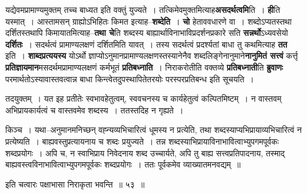\documentclass[article,12pt,a4paper]{memoir}
\begin{document}
	  \pstart यद्येवमप्रामाण्यमुक्तम् तच्च बाध्य\leavevmode{}त इति वक्तुं युज्यते । तत्किमेवमुक्तमित्याह\textbf{असदर्थत्वमि}ति । \textbf{ही}ति यस्मात् । आस्तामसन् ग्राह्योऽभिहितः किमत इत्याह--\textbf{शब्देति} । \textbf{चो} हेताववधारणे वा । शब्दोऽप्यतस्तथा दर्शितस्तथापि किमायातमित्याह--\textbf{तथा चे}ति शब्दस्य बाह्यार्थाविनाभाविप्रदर्शनप्रकारे सति \textbf{सन्नर्थो}ऽध्यवसेयो \textbf{दर्शितः} । सदर्थत्वं प्रामाण्यलक्षणं दर्शितमिति यावत् । तस्य सदर्थत्वं प्रदर्श्यतां बाधा तु कथमित्याह \textbf{तत} इति । \textbf{शाब्दप्रत्ययस्य} योऽर्थो ज्ञाप्योऽनुमानप्रामाण्यलक्षणस्तस्यानेनैव शब्दलिङ्गेनानुमाने\textbf{नानुमितं सत्त्वं} कर्त्तृ \textbf{प्रतिज्ञायमान}मसदर्थमप्रामाण्यलक्षणं कर्मभूतं \textbf{प्रतिबध्नाति} । निराकरोतीति वक्तव्ये \textbf{प्रतिबध्नाती}ति \textbf{ब्रुवाणः} परमार्थतोऽस्यावास्तवत्वान्न बाधा किन्त्वेतदुपस्थापितेतरयोः परस्परप्रतिबन्ध इति सूचयति ।
	\pend
	  \bigskip
	  \begingroup
	

	  \pstart तदयुक्तम् । यत इह प्रतीतेः स्वभावहेतुत्वम्, स्ववचनस्य च कार्यहेतुत्वं कल्पितमिष्टम् । न वास्तवम् अभिप्रायकार्यत्वं च वास्तवमेव शब्दस्य । ततस्तदिह न गृह्यते ।
	\pend
        

	  \pstart किञ्च । यथा--अनुमानमनिच्छन् वह्न्यव्यभिचारित्वं धूमस्य न प्रत्येति, तथा शब्दस्याप्यभिप्रायाव्यभिचारित्वं न प्रत्येष्यति । बाह्यवस्तुप्रत्यायनाय च शब्दः प्रयुज्यते । तन्न शब्दस्याभिप्रायाविनाभावित्वाभ्युपगमपूर्वकः शब्दप्रयोगः । अपि च, न स्वाभिप्राय निवेदनाय शब्द उच्चार्यते, अपि तु बाह्य सत्त्वप्रतिपादनाय, तस्माद् बाह्यवस्त्वविनाभावित्वाभ्युपगमपूर्वकः शब्दप्रयोगः । ततः पूर्वकमेव व्याख्यातमनवद्यम् ॥
	\pend
        
	  \bigskip
	  \begingroup
	

	  \pstart इति चत्वारः पक्षाभासा निराकृता भवन्ति ॥ ५३ ॥
	\pend
      
	  \endgroup
	 
\end{document}
